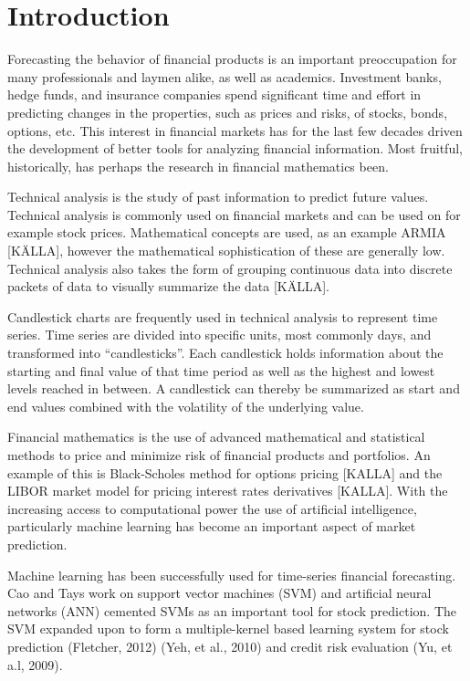 \documentclass{article}
\begin{document}
\section{Introduction}
Forecasting the behavior of financial products is an important preoccupation for many professionals and laymen alike, as well as academics. Investment banks, hedge funds, and insurance companies spend significant time and effort in predicting changes in the properties, such as prices and risks, of stocks, bonds, options, etc. This interest in financial markets has for the last few decades driven the development of better tools for analyzing financial information. Most fruitful, historically, has perhaps the research in financial mathematics been. 

Technical analysis is the study of past information to predict future values. Technical analysis is commonly used on financial markets and can be used on for example stock prices. Mathematical concepts are used, as an example ARMIA [KÄLLA], however the mathematical sophistication of these are generally low. Technical analysis also takes the form of grouping continuous data into discrete packets of data to visually summarize the data [KÄLLA].

Candlestick charts are frequently used in technical analysis to represent time series. Time series are divided into specific units, most commonly days, and transformed into “candlesticks”. Each candlestick holds information about the starting and final value of that time period as well as the highest and lowest levels reached in between. A candlestick can thereby be summarized as start and end values combined with the volatility of the underlying value.

Financial mathematics is the use of advanced mathematical and statistical methods to price and minimize risk of financial products and portfolios. An example of this is Black-Scholes method for options pricing [KALLA] and the LIBOR market model for pricing interest rates derivatives [KALLA]. With the increasing access to computational power the use of artificial intelligence, particularly machine learning has become an important aspect of market prediction. 

Machine learning has been successfully used for time-series financial forecasting. Cao and Tays work on support vector machines (SVM) and artificial neural networks (ANN) cemented SVMs as an important tool for stock prediction. The SVM expanded upon to form a multiple-kernel based learning system for stock prediction (Fletcher, 2012) (Yeh, et al., 2010) and credit risk evaluation (Yu, et a.l, 2009). 
\end{document}
